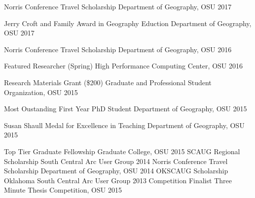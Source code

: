 
\begin{cvhonors}

  \cvhonor
    {Norris Conference Travel Scholarship} %
    {} %
    {Department of Geography, OSU} %
    {2017} %

  \cvhonor
    {Jerry Croft and Family Award in Geography Eduction} %
    {} %
    {Department of Geography, OSU} %
    {2017} %

  \cvhonor
    {Norris Conference Travel Scholarship} %
    {} %
    {Department of Geography, OSU} %
    {2016} %

  \cvhonor
    {Featured Researcher (Spring)}%
    {} %
    {High Performance Computing Center, OSU} %
    {2016} %

  \cvhonor
    {Research Materials Grant (\$200)}%
    {} %
    {Graduate and Professional Student Organization, OSU} %
    {2015} %

  \cvhonor
    {Most Oustanding First Year PhD Student}%
    {} %
    {Department of Geography, OSU} %
    {2015} %

  \cvhonor
    {Susan Shaull Medal for Excellence in Teaching}%
    {} %
    {Department of Geography, OSU} %
    {2015} %

  \cvhonor
    {Top Tier Graduate Fellowship}%
    {} %
    {Graduate College, OSU} %
    {2015} %
  \cvhonor
    {SCAUG Regional Scholarship}%
    {} %
    {South Central Arc User Group} %
    {2014} %
  \cvhonor
    {Norris Conference Travel Scholarship}%
    {} %
    {Department of Geography, OSU} %
    {2014} %
  \cvhonor
    {OKSCAUG Scholarship}%
    {} %
    {Oklahoma South Central Arc User Group} %
    {2013} %
  \cvhonor
    {Competition Finalist}%
    {} %
    {Three Minute Thesis Competition, OSU} %
    {2015} %
\end{cvhonors}
